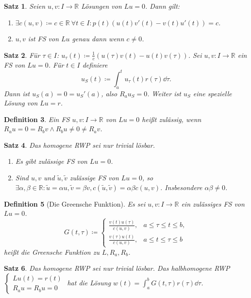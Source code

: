 \documentclass[a4paper]{article}
\newcounter{Sec}
\theoremstyle{marginbreak}
\newtheorem{definition}{Definition}[Sec]
\newtheorem{satz}[definition]{Satz}
\newcommand{\R}{\mathbb{R}}
\begin{document}
	\begin{satz}
		Seien $u, v\colon I\to\R$ Lösungen von $Lu=0$. Dann gilt:
		\begin{enumerate}[label=(\alph*)]
			\item $\exists c(u,v)\coloneqq c\in\R~\forall t\in I: p(t)(u(t)v'(t) - v(t)u'(t))=c$.
			\item $u, v$ ist FS von $Lu$ genau dann wenn $c\neq 0$.
		\end{enumerate}
	\end{satz}
	\begin{satz}
		Für $\tau\in I$: $u_\tau(t)\coloneqq\frac{1}{c}(u(\tau)v(t)-u(t)v(\tau))$.
		Sei $u, v\colon I\to\R$ ein FS von $Lu=0$. Für $t\in I$ definiere \[u_S(t)\coloneqq\int_a^tu_\tau(t)r(\tau)\dd{\tau}.\]
		Dann ist $u_S(a)=0=u_S'(a)$, also $R_au_S=0$. Weiter ist $u_S$ eine spezielle Lösung von $Lu=r$.
	\end{satz}
	\begin{definition}
		Ein FS $u, v\colon I\to\R$ von $Lu=0$ heißt zulässig, wenn $R_au=0=R_bv\wedge R_bu\neq 0\neq R_av$.
	\end{definition}
	\begin{satz}
		Das homogene RWP sei nur trivial lösbar.
		\begin{enumerate}[label=(\alph*)]
			\item Es gibt zulässige FS von $Lu=0$.
			\item Sind $u, v$ und $\tilde{u},\tilde{v}$ zulässige FS von $Lu=0$, so
				$\exists\alpha,\beta\in\R:\tilde{u}=\alpha u, \tilde{v}=\beta v,
				c(\tilde{u},\tilde{v})=\alpha\beta c(u, v)$. Insbesondere $\alpha\beta\neq 0$.
		\end{enumerate}
	\end{satz}
	\begin{definition}[Die Greensche Funktion]
		Es sei $u, v\colon I\to\R$ ein zulässiges FS von $Lu=0$.
		\[G(t,\tau)\coloneqq\begin{cases}\frac{v(t)u(\tau)}{c(u, v)}, &a\leq\tau\leq t\leq b,\\
			\frac{v(\tau)u(t)}{c(u, v)}, &a\leq t\leq\tau\leq b\end{cases}
		\]
		heißt die Greensche Funktion zu $L, R_a, R_b$.
	\end{definition}
	\begin{satz}
		Das homogene RWP sei nur trivial lösbar.
		Das halbhomogene RWP $\begin{cases}Lu(t)=r(t)\\R_au=R_bu=0\end{cases}$ hat die Lösung
		$w(t)=\int_a^b G(t,\tau)r(\tau)\dd{\tau}$.
	\end{satz}
\end{document}
